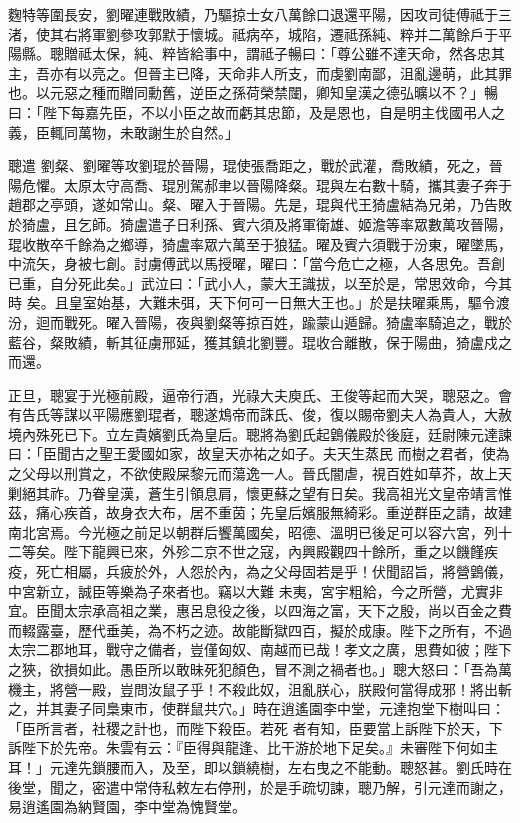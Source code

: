 \begin{pinyinscope}
 麴特等圍長安，劉曜連戰敗績，乃驅掠士女八萬餘口退還平陽，因攻司徒傅祗于三渚，使其右將軍劉參攻郭默于懷城。祗病卒，城陷，遷祗孫純、粹并二萬餘戶于平陽縣。聰贈祗太保，純、粹皆給事中，謂祗子暢曰：「尊公雖不達天命，然各忠其主，吾亦有以亮之。但晉主已降，天命非人所支，而虔劉南鄙，沮亂邊萌，此其罪也。以元惡之種而贈同勳舊，逆臣之孫荷榮禁闥，卿知皇漢之德弘曠以不？」暢曰：「陛下每嘉先臣，不以小臣之故而虧其忠節，及是恩也，自是明主伐國弔人之義，臣輒同萬物，未敢謝生於自然。」



 聰遣
 劉粲、劉曜等攻劉琨於晉陽，琨使張喬距之，戰於武灌，喬敗績，死之，晉陽危懼。太原太守高喬、琨別駕郝聿以晉陽降粲。琨與左右數十騎，攜其妻子奔于趙郡之亭頭，遂如常山。粲、曜入于晉陽。先是，琨與代王猗盧結為兄弟，乃告敗於猗盧，且乞師。猗盧遣子日利孫、賓六須及將軍衛雄、姬澹等率眾數萬攻晉陽，琨收散卒千餘為之鄉導，猗盧率眾六萬至于狼猛。曜及賓六須戰于汾東，曜墜馬，中流矢，身被七創。討虜傅武以馬授曜，曜曰：「當今危亡之極，人各思免。吾創已重，自分死此矣。」武泣曰：「武小人，蒙大王識拔，以至於是，常思效命，今其時
 矣。且皇室始基，大難未弭，天下何可一日無大王也。」於是扶曜乘馬，驅令渡汾，迴而戰死。曜入晉陽，夜與劉粲等掠百姓，踰蒙山遁歸。猗盧率騎追之，戰於藍谷，粲敗績，斬其征虜邢延，獲其鎮北劉豐。琨收合離散，保于陽曲，猗盧戍之而還。



 正旦，聰宴于光極前殿，逼帝行酒，光祿大夫庾氏、王俊等起而大哭，聰惡之。會有告氏等謀以平陽應劉琨者，聰遂鴆帝而誅氏、俊，復以賜帝劉夫人為貴人，大赦境內殊死已下。立左貴嬪劉氏為皇后。聰將為劉氏起䳨儀殿於後庭，廷尉陳元達諫曰：「臣聞古之聖王愛國如家，故皇天亦祐之如子。夫天生蒸民
 而樹之君者，使為之父母以刑賞之，不欲使殿屎黎元而蕩逸一人。晉氏闇虐，視百姓如草芥，故上天剿絕其祚。乃眷皇漢，蒼生引領息肩，懷更蘇之望有日矣。我高祖光文皇帝靖言惟茲，痛心疾首，故身衣大布，居不重茵；先皇后嬪服無綺彩。重逆群臣之請，故建南北宮焉。今光極之前足以朝群后饗萬國矣，昭德、溫明已後足可以容六宮，列十二等矣。陛下龍興已來，外殄二京不世之寇，內興殿觀四十餘所，重之以饑饉疾疫，死亡相屬，兵疲於外，人怨於內，為之父母固若是乎！伏聞詔旨，將營䳨儀，中宮新立，誠臣等樂為子來者也。竊以大難
 未夷，宮宇粗給，今之所營，尤實非宜。臣聞太宗承高祖之業，惠呂息役之後，以四海之富，天下之殷，尚以百金之費而輟露臺，歷代垂美，為不朽之迹。故能斷獄四百，擬於成康。陛下之所有，不過太宗二郡地耳，戰守之備者，豈僅匈奴、南越而已哉！孝文之廣，思費如彼；陛下之狹，欲損如此。愚臣所以敢昧死犯顏色，冒不測之禍者也。」聰大怒曰：「吾為萬機主，將營一殿，豈問汝鼠子乎！不殺此奴，沮亂朕心，朕殿何當得成邪！將出斬之，并其妻子同梟東市，使群鼠共穴。」時在逍遙園李中堂，元達抱堂下樹叫曰：「臣所言者，社稷之計也，而陛下殺臣。若死
 者有知，臣要當上訴陛下於天，下訴陛下於先帝。朱雲有云：『臣得與龍逢、比干游於地下足矣。』未審陛下何如主耳！」元達先鎖腰而入，及至，即以鎖繞樹，左右曳之不能動。聰怒甚。劉氏時在後堂，聞之，密遣中常侍私敕左右停刑，於是手疏切諫，聰乃解，引元達而謝之，易逍遙園為納賢園，李中堂為愧賢堂。




\end{pinyinscope}
